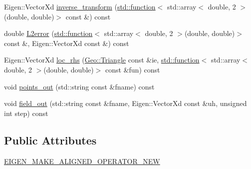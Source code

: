 \begin{DoxyCompactItemize}
\item 
Eigen\-::\-Vector\-Xd \hyperlink{classTspeed_1_1FESpace_aafec3cff8a08e4bdc84959a7e71dbb0c}{inverse\-\_\-transform} (\hyperlink{vtk__vector__out_8m_a6235d6cebbf2f77ca6dbae2811d86530}{std\-::function}$<$ std\-::array$<$ double, 2 $>$(double, double)$>$ const \&) const 
\item 
double \hyperlink{classTspeed_1_1FESpace_a3116d3c8e006c2449a957a4184b3511d}{L2error} (\hyperlink{vtk__vector__out_8m_a6235d6cebbf2f77ca6dbae2811d86530}{std\-::function}$<$ std\-::array$<$ double, 2 $>$(double, double)$>$ const \&, Eigen\-::\-Vector\-Xd const \&) const 
\item 
Eigen\-::\-Vector\-Xd \hyperlink{classTspeed_1_1FESpace_a0336e65ff3cbd3e2ffa948750e3ce805}{loc\-\_\-rhs} (\hyperlink{classTspeed_1_1Geo_1_1Triangle}{Geo\-::\-Triangle} const \&ie, \hyperlink{vtk__vector__out_8m_a6235d6cebbf2f77ca6dbae2811d86530}{std\-::function}$<$ std\-::array$<$ double, 2 $>$(double, double)$>$ const \&fun) const 
\item 
void \hyperlink{classTspeed_1_1FESpace_ad92a40f39edfb095b42bc6389b11d78f}{points\-\_\-out} (std\-::string const \&fname) const 
\item 
void \hyperlink{classTspeed_1_1FESpace_a72a024911d1a650c078e0bfc66ccc837}{field\-\_\-out} (std\-::string const \&fname, Eigen\-::\-Vector\-Xd const \&uh, unsigned int step) const 
\end{DoxyCompactItemize}
\subsection*{Public Attributes}
\begin{DoxyCompactItemize}
\item 
\hyperlink{classTspeed_1_1FESpace_ac3dd8d1e0ee8533ee01b69775e40f76a}{E\-I\-G\-E\-N\-\_\-\-M\-A\-K\-E\-\_\-\-A\-L\-I\-G\-N\-E\-D\-\_\-\-O\-P\-E\-R\-A\-T\-O\-R\-\_\-\-N\-E\-W}
\end{DoxyCompactItemize}


